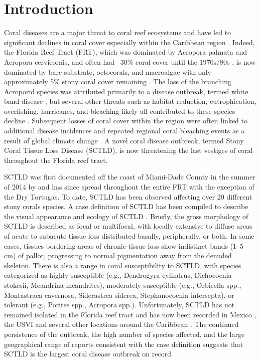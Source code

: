 \documentclass[utf8]{frontiersSCNS}
\begin{document}
\section{Introduction}

Coral diseases are a major threat to coral reef ecosystems and have led to significant declines in coral cover especially within the Caribbean region  \citep{richardson1998florida, sutherland2004disease, aronson2001white, harvell2007coral, miller2009coral, brandt2009dynamics}. Indeed, the Florida Reef Tract (FRT), which was dominated by Acropora palmata and Acropora cervicornis, and often had ~30\% coral cover until the 1970s/80s \citep{dustan1987changes, porter1992quantification}, is now dominated by bare substrate, octocorals, and macroalgae with only approximately 5\% stony coral cover remaining \citep{ruzicka2013temporal}. The loss of the branching Acroporid species was attributed primarily to a disease outbreak, termed white band disease \citep{aronson2001white}, but several other threats such as habitat reduction, eutrophication, overfishing, hurricanes, and bleaching likely all contributed to these species decline \citep{acropora2005atlantic}. Subsequent losses of coral cover within the region were often linked to additional disease incidences and repeated regional coral bleaching events as a result of global climate change \citep{kuta1996abundance, richardson1998florida, sutherland2004disease, gardner2003long, aronson2006conservation, kuffner2015century, manzello2015rapid}. A novel coral disease outbreak, termed Stony Coral Tissue Loss Disease (SCTLD), is now threatening the last vestiges of coral throughout the Florida reef tract.

SCTLD was first documented off the coast of Miami-Dade County in the summer of 2014 by \cite{precht2016unprecedented} and has since spread throughout the entire FRT with the exception of the Dry Tortugas. To date, SCTLD has been observed affecting over 20 different stony corals species. A case definition of SCTLD has been compiled to describe the visual appearance and ecology of SCTLD \citep{noaa2018}. Briefly, the gross morphology of SCTLD is described as focal or multifocal, with locally extensive to diffuse areas of acute to subacute tissue loss distributed basally, peripherally, or both. In some cases, tissues bordering areas of chronic tissue loss show indistinct bands (1–5 cm) of pallor, progressing to normal pigmentation away from the denuded skeleton. There is also a range in coral susceptibility to SCTLD, with species categorized as highly susceptible (e.g., Dendrogyra cylindrus, Dichocoenia stokesii, Meandrina meandrites), moderately susceptible (e.g., Orbicella spp., Montastraea cavernosa, Siderastrea siderea, Stephanocoenia intersepta), or tolerant (e.g., Porites spp., Acropora spp.). Unfortunately, SCTLD has not remained isolated in the Florida reef tract and has now been recorded in Mexico \citep{alvarez2019rapid}, the USVI \citep{blondeau2020coral} and several other locations around the Caribbean \citep{kramer2019map}. The continued persistence of the outbreak, the high number of species affected, and the large geographical range of reports consistent with the case definition suggests that SCTLD is the largest coral disease outbreak on record 
\end{document}
